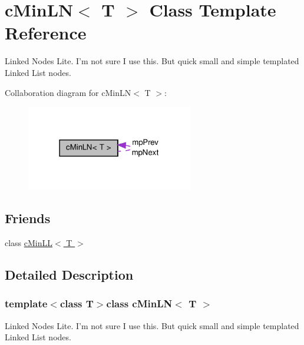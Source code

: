 \hypertarget{classc_min_l_n}{
\section{cMinLN$<$ T $>$ Class Template Reference}
\label{classc_min_l_n}
}


Linked Nodes Lite. I'm not sure I use this. But quick small and simple templated Linked List nodes.  




Collaboration diagram for cMinLN$<$ T $>$:\nopagebreak
\begin{figure}[H]
\begin{center}
\leavevmode
\includegraphics[width=207pt]{classc_min_l_n__coll__graph}
\end{center}
\end{figure}
\subsection*{Friends}
\begin{DoxyCompactItemize}
\item 
\hypertarget{classc_min_l_n_afe8a889f8a2d6d0d7ff40bcf4dcbc024}{
class \hyperlink{classc_min_l_n_afe8a889f8a2d6d0d7ff40bcf4dcbc024}{cMinLL$<$ T $>$}}
\label{classc_min_l_n_afe8a889f8a2d6d0d7ff40bcf4dcbc024}

\end{DoxyCompactItemize}


\subsection{Detailed Description}
\subsubsection*{template$<$class T$>$class cMinLN$<$ T $>$}

Linked Nodes Lite. I'm not sure I use this. But quick small and simple templated Linked List nodes. 